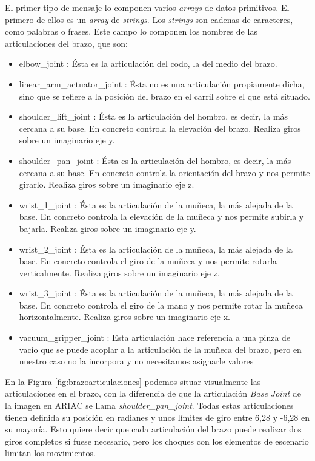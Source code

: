 El primer tipo de mensaje lo componen varios \textit{arrays} de datos primitivos. El primero de ellos es un \textit{array} de \textit{strings}. Los \textit{strings} son cadenas de caracteres, como palabras o frases. Este campo lo componen los nombres de las articulaciones del brazo, que son:
\begin{itemize}
	\item elbow\_joint : Ésta es la articulación del codo, la del medio del brazo.
	
	\item linear\_arm\_actuator\_joint : Ésta no es una articulación propiamente dicha, sino que se refiere a la posición del brazo en el carril sobre el que está situado.
	
	\item shoulder\_lift\_joint : Ésta es la articulación del hombro, es decir, la más cercana a su base. En concreto controla la elevación del brazo. Realiza giros sobre un imaginario eje y.
	
	\item shoulder\_pan\_joint : Ésta es la articulación del hombro, es decir, la más cercana a su base. En concreto controla la orientación del brazo y nos permite girarlo. Realiza giros sobre un imaginario eje z.
	
	\item wrist\_1\_joint : Ésta es la articulación de la muñeca, la más alejada de la base. En concreto controla la elevación de la muñeca y nos permite subirla y bajarla. Realiza giros sobre un imaginario eje y.
	
	\item wrist\_2\_joint : Ésta es la articulación de la muñeca, la más alejada de la base. En concreto controla el giro de la muñeca y nos permite rotarla verticalmente. Realiza giros sobre un imaginario eje z.
	
	\item wrist\_3\_joint : Ésta es la articulación de la muñeca, la más alejada de la base. En concreto controla el giro de la mano y nos permite rotar la muñeca horizontalmente. Realiza giros sobre un imaginario eje x.
	
	\item vacuum\_gripper\_joint : Esta articulación hace referencia a una pinza de vacío que se puede acoplar a la articulación de la muñeca del brazo, pero en nuestro caso no la incorpora y no necesitamos asignarle valores
\end{itemize}

En la Figura \ref{fig:brazoarticulaciones} podemos situar visualmente las articulaciones en el brazo, con la diferencia de que la articulación \textit{Base Joint} de la imagen en ARIAC se llama \textit{shoulder\_pan\_joint}. Todas estas articulaciones tienen definida su posición en radianes y unos límites de giro entre 6,28 y -6,28 en su mayoría. Esto quiere decir que cada articulación del brazo puede realizar dos giros completos si fuese necesario, pero los choques con los elementos de escenario limitan los movimientos.

